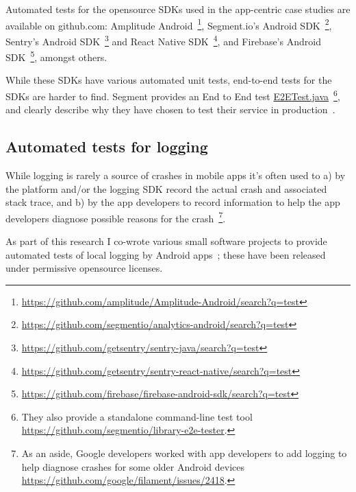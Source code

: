 Automated tests for the opensource SDKs used in the app-centric case studies are available on github.com: Amplitude Android~\footnote{\url{https://github.com/amplitude/Amplitude-Android/search?q=test}}, Segment.io's Android SDK~\footnote{ \url{https://github.com/segmentio/analytics-android/search?q=test}}, Sentry's Android SDK~\footnote{\url{https://github.com/getsentry/sentry-java/search?q=test}} and React Native SDK~\footnote{\url{https://github.com/getsentry/sentry-react-native/search?q=test}}, and Firebase's Android SDK~\footnote{\url{https://github.com/firebase/firebase-android-sdk/search?q=test}}, amongst others. 

While these SDKs have various automated unit tests, end-to-end tests for the SDKs are harder to find. Segment provides an End to End test  \href{https://github.com/segmentio/analytics-android/blob/master/analytics-samples/analytics-sample/src/androidTest/java/com/segment/analytics/E2ETest.java}{E2ETest.java}~\footnote{They also provide a standalone command-line test tool \url{https://github.com/segmentio/library-e2e-tester}.}, and clearly describe why they have chosen to test their service in production~\citep{segment2018_we_test_in_production_you_should_too}.  

\subsection{Automated tests for logging}
While logging is rarely a source of crashes in mobile apps it's often used to a) by the platform and/or the logging SDK record the actual crash and associated stack trace, and b) by the app developers to record information to help the app developers diagnose possible reasons for the crash~\footnote{As an aside, Google developers worked with app developers to add logging to help diagnose crashes for some older Android devices \url{https://github.com/google/filament/issues/2418}.}. 

As part of this research I co-wrote various small software projects to provide automated tests of local logging by Android apps~\citep{android_crash_dummy, android_log_assert}; these have been released under permissive opensource licenses.

